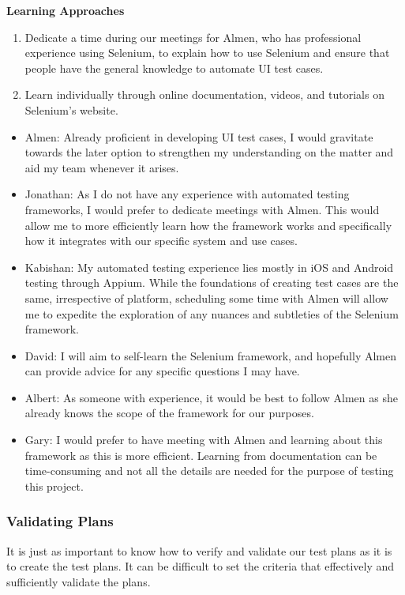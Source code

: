 \documentclass[12pt, titlepage]{article}
\begin{document}
\noindent \textbf{Learning Approaches}
\begin{enumerate}
    \item Dedicate a time during our meetings for Almen, who has professional
    experience using Selenium, to explain how to use Selenium and ensure that
    people have the general knowledge to automate UI test cases.
    \item Learn individually through online documentation, videos, and tutorials
    on Selenium's website.
\end{enumerate}

\begin{itemize}
    \item Almen: Already proficient in developing UI test cases, I would
    gravitate towards the later option to strengthen my understanding on the
    matter and aid my team whenever it arises.
    \item Jonathan: As I do not have any experience with automated testing
    frameworks, I would prefer to dedicate meetings with Almen. This would allow
    me to more efficiently learn how the framework works and specifically how it
    integrates with our specific system and use cases.
    \item Kabishan: My automated testing experience lies mostly in iOS and
    Android testing through Appium. While the foundations of creating test cases
    are the same, irrespective of platform, scheduling some time with Almen will
    allow me to expedite the exploration of any nuances and subtleties of the
    Selenium framework.
    \item David: I will aim to self-learn the Selenium framework, and hopefully
    Almen can provide advice for any specific questions I may have.
    \item Albert: As someone with experience, it would be best to follow Almen
    as she already knows the scope of the framework for our purposes.
    \item Gary: I would prefer to have meeting with Almen and learning about
    this framework as this is more efficient. Learning from documentation can be
    time-consuming and not all the details are needed for the purpose of testing
    this project.
\end{itemize}

\subsubsection{Validating Plans}
It is just as important to know how to verify and validate our test plans as it
is to create the test plans. It can be difficult to set the criteria that
effectively and sufficiently validate the plans. \\
\end{document}
